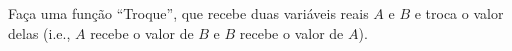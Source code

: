 
\question[10]

Faça uma função ``Troque'', que recebe duas variáveis reais $A$ e $B$ e troca o valor delas (i.e., $A$ recebe o valor de $B$ e $B$ recebe o valor de $A$).

